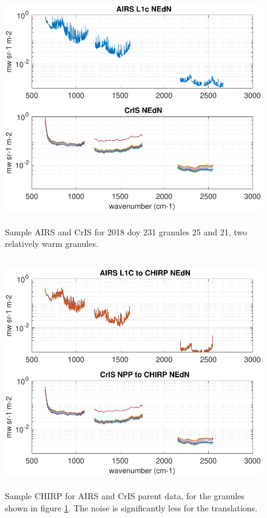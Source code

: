 \documentclass[11pt]{article}
\begin{document}
\begin{figure}
  \centering
  \includegraphics[height=10cm]{figures/sample_airs_and_cris_nedn.pdf}
  \caption{Sample AIRS and CrIS {\nedn} for 2018 doy 231 granules 25
    and 21, two relatively warm granules.}
  \label{fig12}
\end{figure}

\begin{figure}
  \centering
  \includegraphics[height=10cm]{figures/chirp_nedn_from_airs_and_cris.pdf}
  \caption{Sample CHIRP {\nedn} for AIRS and CrIS parent data, for
    the granules shown in figure \ref{fig12}.  The noise is
    significantly less for the translations.}
  \label{fig13}
\end{figure}
\end{document}
